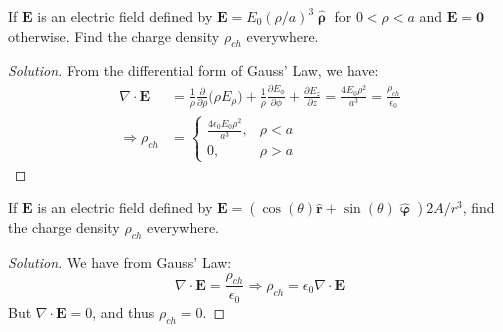             \begin{problem}[Wangsness 4-11]
                If $\mathbf{E}$ is an electric field defined by
                $\mathbf{E}=E_{0}(\rho/a)^{3}\hat{\boldsymbol{\uprho}}$
                for $0<\rho<a$ and $\mathbf{E}=\mathbf{0}$ otherwise.
                Find the charge density $\rho_{ch}$ everywhere.
            \end{problem}
            \begin{proof}[Solution]
                From the differential form of Gauss' Law, we have:
                \begin{align*}
                    \nabla\cdot\mathbf{E}
                    &=\frac{1}{\rho}\frac{\partial}{\partial\rho}
                    \big(\rho{E}_{\rho}\big)
                    +\frac{1}{\rho}
                    \frac{\partial{E_{\phi}}}{\partial\phi}
                    +\frac{\partial{E_{z}}}{\partial{z}}
                    =\frac{4E_{0}\rho^{2}}{a^{3}}
                    =\frac{\rho_{ch}}{\epsilon_{0}}\\
                    \Rightarrow\rho_{ch}
                    &=
                    \begin{cases}
                        \frac{4\epsilon_{0}E_{0}\rho^{2}}{a^{3}},
                        &\rho<a\\
                        0,
                        &\rho>a
                    \end{cases}
                \end{align*}
            \end{proof}
            \begin{problem}[Wangsness 4-12]
                If $\mathbf{E}$ is an electric field defined by
                $\mathbf{E}%
                 =(\cos(\theta)\hat{\mathbf{r}}%
                 +\sin(\theta)\hat{\boldsymbol{\upvarphi}})2A/r^{3}$,
                find the charge density $\rho_{ch}$ everywhere.
            \end{problem}
            \begin{proof}[Solution]
                We have from Gauss' Law:
                \begin{equation*}
                    \nabla\cdot\mathbf{E}=\frac{\rho_{ch}}{\epsilon_{0}}
                    \Rightarrow\rho_{ch}=\epsilon_{0}\nabla\cdot\mathbf{E}
                \end{equation*}
                But $\nabla\cdot\mathbf{E}=0$, and thus $\rho_{ch}=0$.
            \end{proof}
